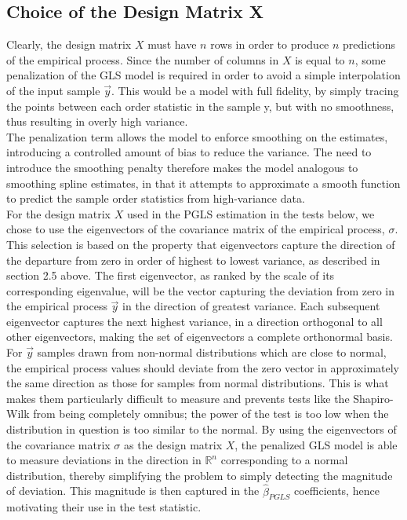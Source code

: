 \documentclass[12pt]{article}
\begin{document}
\subsection{Choice of the Design Matrix X}

Clearly, the design matrix $X$ must have $n$ rows in order to produce $n$ predictions of the empirical process. Since the number of columns in $X$ is equal to $n$, some penalization of the GLS model is required in order to avoid a simple interpolation of the input sample $\vec{y}$. This would be a model with full fidelity, by simply tracing the points between each order statistic in the sample y, but with no smoothness, thus resulting in overly high variance.\\

The penalization term allows the model to enforce smoothing on the estimates, introducing a controlled amount of bias to reduce the variance. The need to introduce the smoothing penalty therefore makes the model analogous to smoothing spline estimates, in that it attempts to approximate a smooth function to predict the sample order statistics from high-variance data.\\

For the design matrix $X$ used in the PGLS estimation in the tests below, we chose to use the eigenvectors of the covariance matrix of the empirical process, $\sigma$. This selection is based on the property that eigenvectors capture the direction of the departure from zero in order of highest to lowest variance, as described in section 2.5 above. The first eigenvector, as ranked by the scale of its corresponding eigenvalue, will be the vector capturing the deviation from zero in the empirical process $\vec{y}$ in the direction of greatest variance. Each subsequent eigenvector captures the next highest variance, in a direction orthogonal to all other eigenvectors, making the set of eigenvectors a complete orthonormal basis. \\

For $\vec{y}$ samples drawn from non-normal distributions which are close to normal, the empirical process values should deviate from the zero vector in approximately the same direction as those for samples from normal distributions. This is what makes them particularly difficult to measure and prevents tests like the Shapiro-Wilk from being completely omnibus; the power of the test is too low when the distribution in question is too similar to the normal. By using the eigenvectors of the covariance matrix $\sigma$ as the design matrix $X$, the penalized GLS model is able to measure deviations in the direction in $\mathbb{R}^n$ corresponding to a normal distribution, thereby simplifying the problem to simply detecting the magnitude of deviation. This magnitude is then captured in the $\hat{\beta}_{PGLS}$ coefficients, hence motivating their use in the test statistic.
\end{document}
